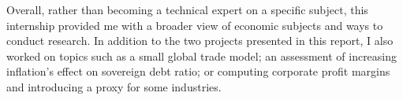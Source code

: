Overall, rather than becoming a technical expert on a specific subject, this internship provided me with a broader view of economic subjects and ways to conduct research. 
In addition to the two projects presented in this report, I also worked on topics such as a small global trade model\cite{az_trade}; an assessment of increasing inflation’s effect on sovereign debt ratio; or computing corporate profit margins and introducing a proxy for some industries\cite{az_margins}.
